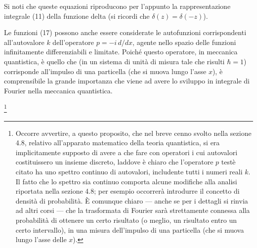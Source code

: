 \documentclass[11pt, a4paper]{book}
\numberwithin{equation}{section}
\begin{document}
Si noti che queste equazioni riproducono per l'appunto la rappresentazione integrale (11) della funzione delta (si ricordi che $\delta(z)=\delta(-z)$).

Le funzioni (17) possono anche essere considerate le autofunzioni corrispondenti all'autovalore $k$ dell'operatore $p=-i\,d/dx$, agente nello spazio delle funzioni infinitamente differenziabili e limitate. Poiché questo operatore, in meccanica quantistica, è quello che (in un sistema di unità di misura tale che risulti $\hbar=1$) corrisponde all'impulso di una particella (che si muova lungo l'asse $x$), è comprensibile la grande importanza che viene ad avere lo sviluppo in integrale di Fourier nella meccanica quantistica.

\footnote{Occorre avvertire, a questo proposito, che nel breve cenno svolto nella sezione 4.8, relativo all'apparato matematico della teoria quantistica, si era implicitamente supposto di avere a che fare con operatori i cui autovalori costituissero un insieme discreto, laddove è chiaro che l'operatore $p$ testè citato ha uno spettro continuo di autovalori, includente tutti i numeri reali $k$. Il fatto che lo spettro sia continuo comporta alcune modifiche alla analisi riportata nella sezione 4.8; per esempio occorrerà introdurre il concetto di densità di probabilità. È comunque chiaro --- anche se per i dettagli si rinvia ad altri corsi --- che la trasformata di Fourier sarà strettamente connessa alla probabilità di ottenere un certo risultato (o meglio, un risultato entro un certo intervallo), in una misura dell'impulso di una particella (che si muova lungo l'asse delle $x$).}
\end{document}
